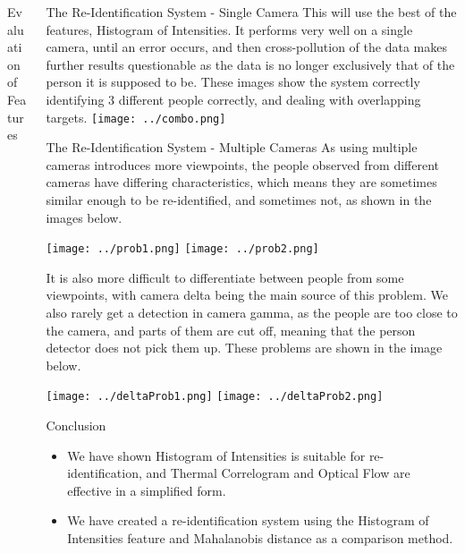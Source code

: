 \documentclass[final]{beamer}
\begin{document}
\begin{frame}{}
\begin{columns}[t]
\begin{column}{.49\linewidth}
\begin{block}{Evaluation of Features}
        \end{block}
	 \end{column}
	 \begin{column}{.49\linewidth}
 		\begin{block}{The Re-Identification System - Single Camera}
 		\justify This will use the best of the features, Histogram of Intensities. It performs very well on a single camera, until an error occurs, and then cross-pollution of the data makes further results questionable as the data is no longer exclusively that of the person it is supposed to be. 
 		These images show the system correctly identifying 3 different people correctly, and dealing with overlapping targets. 
 		\justify
 		\texttt{[image: ../combo.png]}  
         
        \end{block}
        
        \begin{block}{The Re-Identification System - Multiple Cameras}
        \justify
        As using multiple cameras introduces more viewpoints, the people observed from different cameras have differing characteristics, which means they are sometimes similar enough to be re-identified, and sometimes not, as shown in the images below. 	
        	 
 		\texttt{[image: ../prob1.png]}  
 		\hspace{.7cm}
        \texttt{[image: ../prob2.png]}  
        
        \justify It is also more difficult to differentiate between people from some viewpoints, with camera delta being the main source of this problem. We also rarely get a detection in camera gamma, as the people are too close to the camera, and parts of them are cut off, meaning that the person detector does not pick them up. These problems are shown in the image below.
        
        \texttt{[image: ../deltaProb1.png]}
        \hspace{.7cm}
        \texttt{[image: ../deltaProb2.png]}  
        \end{block}
        
        \begin{block}{Conclusion}
        \begin{itemize}
         \item We have shown Histogram of Intensities is suitable for re-identification, and Thermal Correlogram and Optical Flow are effective in a simplified form. 
         \item We have created a re-identification system using the Histogram of Intensities feature and Mahalanobis distance as a comparison method. 
         

\end{itemize}
\end{block}
\end{column}
\end{columns}
\end{frame}
\end{document}
